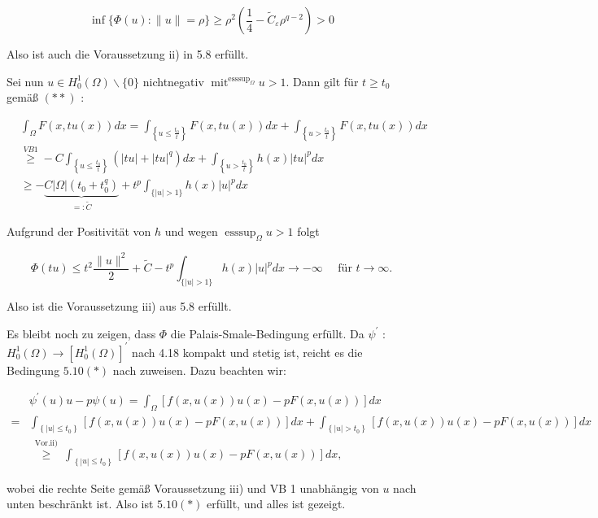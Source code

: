 \documentclass[10pt, letterpaper]{article}
\begin{document}
$$
\inf \{\Phi(u):\|u\|=\rho\} \geq \rho^{2}\left(\frac{1}{4}-\tilde{C}_{\varepsilon} \rho^{q-2}\right)>0
$$

Also ist auch die Voraussetzung ii) in 5.8 erfüllt.

Sei nun $u \in H_{0}^{1}(\Omega) \backslash\{0\}$ nichtnegativ $\operatorname{mit}^{\operatorname{esssup}_{\Omega}} u>1$. Dann gilt für $t \geq t_{0}$ gemäß $(* *)$ :

$$
\begin{aligned}
& \int_{\Omega} F(x, t u(x)) d x=\int_{\left\{u \leq \frac{t_{0}}{t}\right\}} F(x, t u(x)) d x+\int_{\left\{u>\frac{t_{0}}{t}\right\}} F(x, t u(x)) d x \\
& \stackrel{V B 1}{\geq}-C \int_{\left\{u \leq \frac{t_{0}}{t}\right\}}\left(|t u|+|t u|^{q}\right) d x+\int_{\left\{u>\frac{t_{0}}{t}\right\}} h(x)|t u|^{p} d x \\
& \geq-\underbrace{C|\Omega|\left(t_{0}+t_{0}^{q}\right)}_{=: \tilde{C}}+t^{p} \int_{\{|u|>1\}} h(x)|u|^{p} d x
\end{aligned}
$$

Aufgrund der Positivität von $h$ und wegen $\operatorname{esssup}_{\Omega} u>1$ folgt

$$
\Phi(t u) \leq t^{2} \frac{\|u\|^{2}}{2}+\tilde{C}-t^{p} \int_{\{|u|>1\}} h(x)|u|^{p} d x \rightarrow-\infty \quad \text { für } t \rightarrow \infty .
$$

Also ist die Voraussetzung iii) aus 5.8 erfüllt.

Es bleibt noch zu zeigen, dass $\Phi$ die Palais-Smale-Bedingung erfüllt. Da $\psi^{\prime}$ : $H_{0}^{1}(\Omega) \rightarrow\left[H_{0}^{1}(\Omega)\right]^{\prime}$ nach 4.18 kompakt und stetig ist, reicht es die Bedingung $5.10(*)$ nach zuweisen. Dazu beachten wir:

$$
\begin{aligned}
& \psi^{\prime}(u) u-p \psi(u)=\int_{\Omega}[f(x, u(x)) u(x)-p F(x, u(x))] d x \\
= & \int_{\left\{|u| \leq t_{0}\right\}}[f(x, u(x)) u(x)-p F(x, u(x))] d x+\int_{\left\{|u|>t_{0}\right\}}[f(x, u(x)) u(x)-p F(x, u(x))] d x \\
& \stackrel{\text { Vor.ii) }}{\geq} \int_{\left\{|u| \leq t_{0}\right\}}[f(x, u(x)) u(x)-p F(x, u(x))] d x,
\end{aligned}
$$

wobei die rechte Seite gemäß Voraussetzung iii) und VB 1 unabhängig von $u$ nach unten beschränkt ist. Also ist $5.10(*)$ erfüllt, und alles ist gezeigt.
\end{document}
